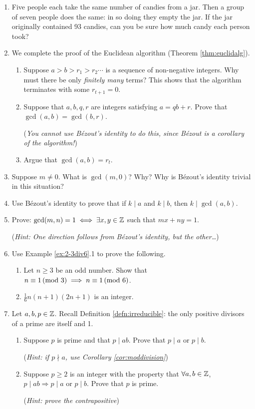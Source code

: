 \begin{exercises}{}{}
\begin{enumerate}
	  \item Five people each take the same number of candies from a jar. Then a group of seven people does the same: in so doing they empty the jar. If the jar originally contained 93 candies, can you be sure how much candy each person took?
	
	
	  \item\label{exs:euclidalgproof} We complete the proof of the Euclidean algorithm (Theorem \ref{thm:euclidalg}).
	  \begin{enumerate}
	    \item Suppose $a>b>r_1>r_2\cdots$ is a sequence of non-negative integers. Why must there be only \emph{finitely many} terms? This shows that the algorithm terminates with some $r_{t+1}=0$.
	    \item Suppose that $a,b,q,r$ are integers satisfying $a=qb+r$. Prove that $\gcd(a,b)=\gcd(b,r)$.\par
	    (\emph{You cannot use Bézout's identity to do this, since Bézout is a corollary of the algorithm!})
	    \item Argue that $\gcd(a,b)=r_t$.
	  \end{enumerate}
	  
	
		\item\label{exs:gcd0} Suppose $m\neq 0$. What is $\gcd(m,0)$? Why? Why is Bézout's identity trivial in this situation?
			
	  
	  \item Use Bézout's identity to prove that if $k\mid a$ and $k\mid b$, then $k\mid\gcd(a,b)$.
	  
	
	  \item\label{ex:gcd1} Prove: $\gcd(m,n)=1\iff\exists x,y\in\mathbb{Z}$ such that $mx+ny=1$.\par
	  (\emph{Hint: One direction follows from Bézout's identity, but the other\ldots})
	    
	    
		\item Use Example \ref{ex:2-3div6}.1 to prove the following.
		\begin{enumerate}
		  \item Let $n\ge 3$ be an odd number. Show that $n\equiv 1\negthickspace\pmod{3}\implies  n\equiv 1\negthickspace\pmod{6}$.
		 	\item $\frac 16n(n+1)(2n+1)$ is an integer.
		\end{enumerate}
	  
	  
		\item\label{exs:primedef1} Let $a,b,p\in\mathbb{Z}$. Recall Definition \ref{defn:irreducible}: the only positive divisors of a prime are itself and 1.
	  \begin{enumerate}
	    \item Suppose $p$ is prime and that $p\mid ab$. Prove that $p\mid a$ or $p\mid b$.\par
	    (\emph{Hint: if $p\nmid a$, use Corollary \ref{cor:moddivision}})
	    \item Suppose $p\ge 2$ is an integer with the property that $\forall a,b\in\mathbb{Z}$, $p\mid ab\Longrightarrow p\mid a$ or $p\mid b$. Prove that $p$ is prime.\par
	    (\emph{Hint: prove the contrapositive})
	  \end{enumerate}
	    

\end{enumerate}
\end{exercises}
